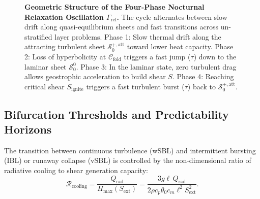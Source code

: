 \begin{figure}[t]
\caption{\textbf{Geometric Structure of the Four-Phase Nocturnal Relaxation Oscillation $\Gamma_{\mathrm{rel}}$.} The cycle alternates between slow drift along quasi-equilibrium sheets and fast transitions across un-stratified layer problems. Phase 1: Slow thermal drift along the attracting turbulent sheet $\mathcal{S}_0^{+,\mathrm{att}}$ toward lower heat capacity. Phase 2: Loss of hyperbolicity at $\mathcal{C}_{\mathrm{fold}}$ triggers a fast jump ($\tau$) down to the laminar sheet $\mathcal{S}_0^0$. Phase 3: In the laminar state, zero turbulent drag allows geostrophic acceleration to build shear $S$. Phase 4: Reaching critical shear $S_{\mathrm{ignite}}$ triggers a fast turbulent burst ($\tau$) back to $\mathcal{S}_0^{+,\mathrm{att}}$.}
\label{fig:relaxation_cycle}
\end{figure}

\subsection{Bifurcation Thresholds and Predictability Horizons}

The transition between continuous turbulence (wSBL) and intermittent bursting (IBL) or runaway collapse (vSBL) is controlled by the non-dimensional ratio of radiative cooling to shear generation capacity:
\begin{equation}
\mathcal{R}_{\mathrm{cooling}} = \frac{Q_{\mathrm{rad}}}{H_{\max}(S_{\mathrm{ext}})} = \frac{3 g \ell \, Q_{\mathrm{rad}}}{2 \rho c_p \theta_0 c_m \ell^2 S_{\mathrm{ext}}^2}.
\label{eq:cooling_ratio}
\end{equation}

